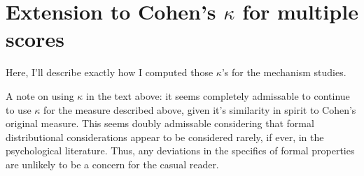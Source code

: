 \graphicspath{{appendices/kappa-extension/}}

\chapter{Extension to Cohen's \texorpdfstring{$\kappa$}{kappa} for multiple scores}

Here, I'll describe exactly how I computed those $\kappa$'s for the mechanism
studies.

A note on using $\kappa$ in the text above: it seems completely admissable to
continue to use $\kappa$ for the measure described above, given it's similarity
in spirit to Cohen's original measure. This seems doubly admissable considering
that formal distributional considerations appear to be considered rarely, if
ever, in the psychological literature. Thus, any deviations in the specifics of
formal properties are unlikely to be a concern for the casual reader.
